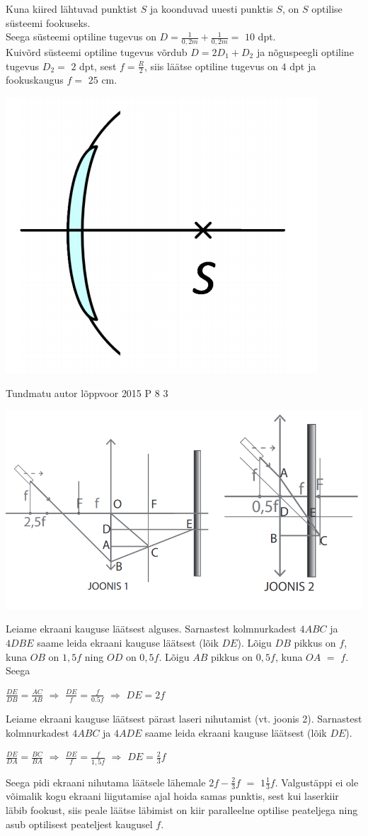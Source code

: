 \documentclass[11pt]{article}
\begin{document}
{{\ifSolution
Kuna kiired lähtuvad punktist $S$ ja koonduvad uuesti punktis $S$, on $S$ optilise süsteemi fookuseks. \\
Seega süsteemi optiline tugevus on $D = \frac{1}{0,2 m} + \frac{1}{0,2 m} =$ $10$ dpt. \\
Kuivõrd süsteemi optiline tugevus võrdub $D = 2D_1 + D_2$ 
ja nõguspeegli optiline tugevus $D_2 =$ $2$ dpt, sest $f = \frac{R}{2}$, siis läätse optiline tugevus on $4$ dpt ja fookuskaugus $f =$ $25$ cm.
\begin{center}
	\includegraphics[width=0.5\linewidth]{2014-v3p-09-lah.PNG}
\end{center}
\fi
}

{Tundmatu autor} %
{lõppvoor} %
{2015} %
{P 8} %
{3} %
{

\ifSolution
\begin{center}
	\includegraphics[width=0.5\linewidth]{2015-v3p-08-lah.PNG}
\end{center}
Leiame ekraani kauguse läätsest alguses. Sarnastest kolmnurkadest $4ABC$ ja $4DBE$ saame leida ekraani kauguse läätsest (lõik $DE$). Lõigu $DB$ pikkus on $f$, kuna $OB$ on $1,5f$ ning $OD$ on $0,5f$. 
Lõigu $AB$ pikkus on $0,5f$, kuna $OA$ $=$ $f$. Seega
\begin{center}
$\frac{DE}{DB} = \frac{AC}{AB}$ 
$\Rightarrow$
$\frac{DE}{f} = \frac{f}{0.5f}$
$\Rightarrow$
$DE = 2f$
\end{center}
Leiame ekraani kauguse läätsest pärast laseri nihutamist (vt. joonis 2). Sarnastest kolmnurkadest $4ABC$ ja $4ADE$ saame leida ekraani kauguse läätsest (lõik $DE$).
\begin{center}
$\frac{DE}{DA} = \frac{BC}{BA}$ $\Rightarrow$ $\frac{DE}{f} = \frac{f}{1,5f}$ $\Rightarrow$ $DE = \frac{2}{3}f$
\end{center}
Seega pidi ekraani nihutama läätsele lähemale $2f - \frac{2}{3} f$ $=$ $1 \frac{1}{3}f$. Valgustäppi ei ole võimalik kogu ekraani liigutamise ajal hoida samas punktis, sest kui laserkiir läbib fookust, siis peale läätse läbimist on kiir paralleelne optilise peateljega ning asub optilisest peateljest kaugusel $f$.
\fi
}

}
\end{document}
